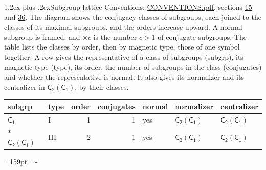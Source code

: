 \documentclass[10pt,a4paper]{article}
\makeatletter
\renewcommand\section{\@startsection{section}{1}{\z@}{-3ex plus -1ex minus -.2ex}%
  {1.2ex plus .2ex}{\normalfont\large\sffamily\bfseries\color{parttitle}}}
\newcommand{\needspace}[1]{\par\penalty-100\begingroup\dimen0=#1\relax\dimen2=\pagegoal
  \advance\dimen2-\pagetotal\ifdim\dimen0>\dimen2\relax\ifdim\dimen2>0pt\vfil\break\fi\fi
  \endgroup}
\numberwithin{equation}{section}
\newcommand{\grp}[1]{\mathsf{#1}}
\makeatother
\begin{document}
\section{Subgroup lattice}\label{s:subgroups}
Conventions: \href{../../CONVENTIONS.pdf}{CONVENTIONS.pdf}, sections \href{../../../rotation/CONVENTIONS.pdf\#conv.15}{15} and \href{../../CONVENTIONS.pdf\#conv.36}{36}.
The diagram shows the conjugacy classes of subgroups, each joined to the classes of its maximal subgroups, and the orders increase upward. \label{n:index.conjugates.c}A normal subgroup is framed, and ${\times}c$ is the number $c > 1$ of conjugate subgroups. The table lists the classes by order, then by magnetic type, those of one symbol together. \label{n:head.subgroup}\label{n:head.magnetic.type}\label{n:head.order}\label{n:head.conjugates}\label{n:head.normal}A row gives the representative of a class of subgroups (subgrp), its magnetic type (type), its order, the number of subgroups in the class (conjugates) and whether the representative is normal. \label{n:head.normalizer}\label{n:head.centralizer}It also gives its normalizer and its centralizer in $\grp{C_{2}}(\grp{C_{1}})$, by their classes. 
\begin{center}
\end{center}
{\small\begin{longtable}{@{}llrrlll@{}}\toprule
subgrp & type & order & conjugates & normal & normalizer & centralizer\\\midrule\endhead
\bottomrule\endfoot\endlastfoot
\href{../../../rotation/data/pdf/C1.pdf}{$\grp{C_{1}}$} & I & 1 & 1 & yes & \href{C2-C1.pdf}{$\grp{C_{2}}(\grp{C_{1}})$} & \href{C2-C1.pdf}{$\grp{C_{2}}(\grp{C_{1}})$}\\*
\href{C2-C1.pdf}{$\grp{C_{2}}(\grp{C_{1}})$} & III & 2 & 1 & yes & \href{C2-C1.pdf}{$\grp{C_{2}}(\grp{C_{1}})$} & \href{C2-C1.pdf}{$\grp{C_{2}}(\grp{C_{1}})$}\\
\bottomrule\end{longtable}}
\needspace{159pt}
\end{document}
